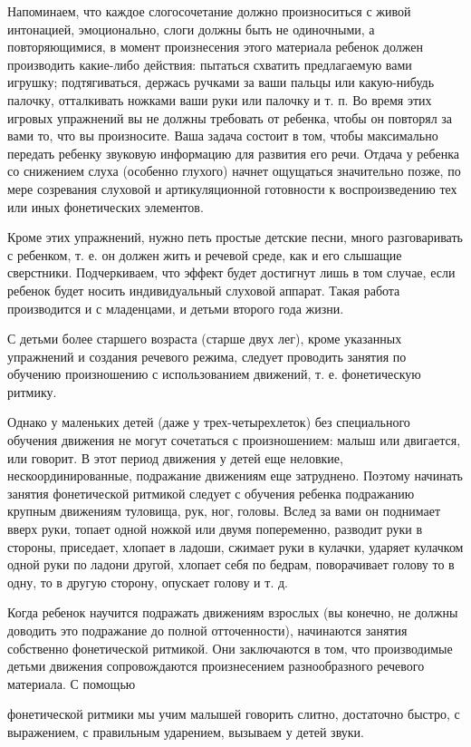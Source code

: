 \documentclass[a5paper]{book}
\begin{document}
Напоминаем, что каждое слогосочетание должно произноситься с живой
интонацией, эмоционально, слоги должны быть не одиночными, а
повторяющимися, в момент произнесения этого материала ребенок должен
производить какие-либо действия: пытаться схватить предлагаемую вами
игрушку; подтягиваться, держась ручками за ваши пальцы или какую-нибудь
палочку, отталкивать ножками ваши руки или палочку и т. п. Во время этих
игровых упражнений вы не должны требовать от ребенка, чтобы он повторял
за вами то, что вы произносите. Ваша задача состоит в том, чтобы
максимально передать ребенку звуковую информацию для развития его речи.
Отдача у ребенка со снижением слуха (особенно глухого) начнет ощущаться
значительно позже, по мере созревания слуховой и артикуляционной
готовности к воспроизведению тех или иных фонетических элементов.

Кроме этих упражнений, нужно петь простые детские песни, много
разговаривать с ребенком, т. е. он должен жить и речевой среде, как и
его слышащие сверстники. Подчеркиваем, что эффект будет достигнут лишь в
том случае, если ребенок будет носить индивидуальный слуховой аппарат.
Такая работа производится и с младенцами, и детьми второго года жизни.

С детьми более старшего возраста (старше двух лег), кроме указанных
упражнений и создания речевого режима, следует проводить занятия по
обучению произношению с использованием движений, т. е. фонетическую
ритмику.

Однако у маленьких детей (даже у трех-четырехлеток) без специального
обучения движения не могут сочетаться с произношением: малыш или
двигается, или говорит. В этот период движения у детей еще неловкие,
нескоординированные, подражание движениям еще затруднено. Поэтому
начинать занятия фонетической ритмикой следует с обучения ребенка
подражанию крупным движениям туловища, рук, ног, головы. Вслед за вами
он поднимает вверх руки, топает одной ножкой или двумя попеременно,
разводит руки в стороны, приседает, хлопает в ладоши, сжимает руки в
кулачки, ударяет кулачком одной руки по ладони другой, хлопает себя по
бедрам, поворачивает голову то в одну, то в другую сторону, опускает
голову и т. д.

Когда ребенок научится подражать движениям взрослых (вы конечно, не
должны доводить это подражание до полной отточенности), начинаются
занятия собственно фонетической ритмикой. Они заключаются в том, что
производимые детьми движения сопровождаются произнесением разнообразного
речевого материала. С помощью

фонетической ритмики мы учим малышей говорить слитно, достаточно быстро,
с выражением, с правильным ударением, вызываем у детей звуки.
\end{document}
